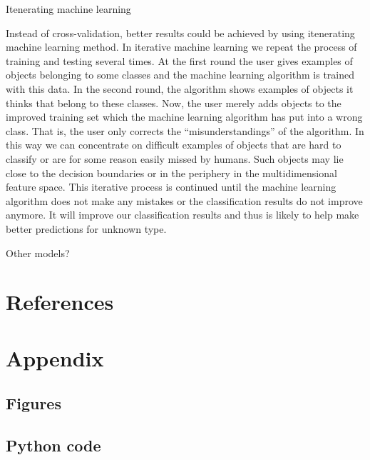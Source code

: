 \documentclass[10pt,letterpaper]{article}
\begin{document}
Itenerating machine learning

Instead of cross-validation, better results could be achieved by using
itenerating machine learning method. In iterative machine learning we
repeat the process of training and testing several times. At the first
round the user gives examples of objects belonging to some classes and
the machine learning algorithm is trained with this data. In the second
round, the algorithm shows examples of objects it thinks that belong to
these classes. Now, the user merely adds objects to the improved
training set which the machine learning algorithm has put into a wrong
class. That is, the user only corrects the ``misunderstandings'' of the
algorithm. In this way we can concentrate on difficult examples of
objects that are hard to classify or are for some reason easily missed
by humans. Such objects may lie close to the decision boundaries or in
the periphery in the multidimensional feature space. This iterative
process is continued until the machine learning algorithm does not make
any mistakes or the classification results do not improve anymore. It
will improve our classification results and thus is likely to help make
better predictions for unknown type.

Other models?

\section*{References}\label{references}

\section{Appendix}\label{appendix}

\subsection{Figures}\label{figures}

\subsection{Python code}\label{python-code}

\nolinenumbers
\end{document}
